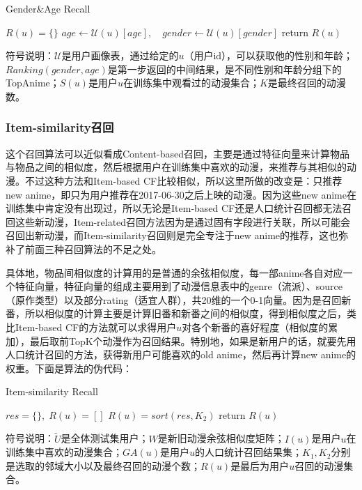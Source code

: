 \begin{algorithm}[htbp]
	\caption{Gender\&Age Recall}
	$R(u)=\{\}$\;
	$age\leftarrow \mathcal{U}(u)[age],\quad gender\leftarrow \mathcal{U}(u)[gender]$\;
	return $R(u)$\;
\end{algorithm}

符号说明：$\mathcal{U}$是用户画像表，通过给定的$u$（用户id），可以获取他的性别和年龄；$Ranking(gender,age)$是第一步返回的中间结果，是不同性别和年龄分组下的TopAnime；$S(u)$是用户$u$在训练集中观看过的动漫集合；$K$是最终召回的动漫数。

\subsubsection{Item-similarity召回}
这个召回算法可以近似看成Content-based召回，主要是通过特征向量来计算物品与物品之间的相似度，然后根据用户在训练集中喜欢的动漫，来推荐与其相似的动漫。不过这种方法和Item-based CF比较相似，所以这里所做的改变是：只推荐new anime，即只为用户推荐在2017-06-30之后上映的动漫。因为这些new anime在训练集中肯定没有出现过，所以无论是Item-based CF还是人口统计召回都无法召回这些新动漫，Item-related召回方法因为是通过固有字段进行关联，所以可能会召回出新动漫，而Item-similarity召回则是完全专注于new anime的推荐，这也弥补了前面三种召回算法的不足之处。

具体地，物品间相似度的计算用的是普通的余弦相似度，每一部anime各自对应一个特征向量，特征向量的组成主要用到了动漫信息表中的genre（流派）、source（原作类型）以及部分rating（适宜人群），共20维的一个0-1向量。因为是召回新番，所以相似度的计算主要是计算旧番和新番之间的相似度，得到相似度之后，类比Item-based CF的方法就可以求得用户$u$对各个新番的喜好程度（相似度的累加），最后取前TopK个动漫作为召回结果。特别地，如果是新用户的话，就要先用人口统计召回的方法，获得新用户可能喜欢的old anime，然后再计算new anime的权重。下面是算法的伪代码：
\begin{algorithm}
	\caption{Item-similarity Recall}
	$res=\{\},\;R(u)=[]$\;
	$R(u)=sort(res,K_2)$\;
	return $R(u)$\;
\end{algorithm}
符号说明：$\tilde{U}$是全体测试集用户；$W$是新旧动漫余弦相似度矩阵；$I(u)$是用户$u$在训练集中喜欢的动漫集合；$GA(u)$是用户$u$的人口统计召回结果集；$K_1,K_2$分别是选取的邻域大小以及最终召回的动漫个数；$R(u)$是最后为用户$u$召回的动漫集合。

